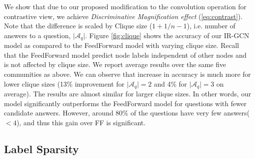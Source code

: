 We show that due to our proposed modification to the convolution operation for contrastive view, we achieve \emph{Discriminative Magnification effect} (\cref{eq:contrast}). Note that the difference is scaled by Clique size ($1 + 1/n-1$), i.e. number of answers to a question, $\vert \mathcal{A}_q \vert$. Figure \ref{fig:clique} shows the accuracy of our IR-GCN model as compared to the FeedForward model with varying clique size. Recall that the FeedForward model predict node labels independent of other nodes and is not affected by clique size. We report average results over the same five communities as above. We can observe that increase in accuracy is much more for lower clique sizes (13\% improvement for $\vert \mathcal{A}_q \vert = 2$ and 4\% for $\vert \mathcal{A}_q \vert = 3$ on average). The results are almost similar for larger clique sizes. In other words, our model significantly outperforms the FeedForward model for questions with fewer candidate answers. However, around 80\% of the questions have very few answers($< 4$), and thus this gain over FF is significant.

\vspace{-0.2in}
\subsection{Label Sparsity}

